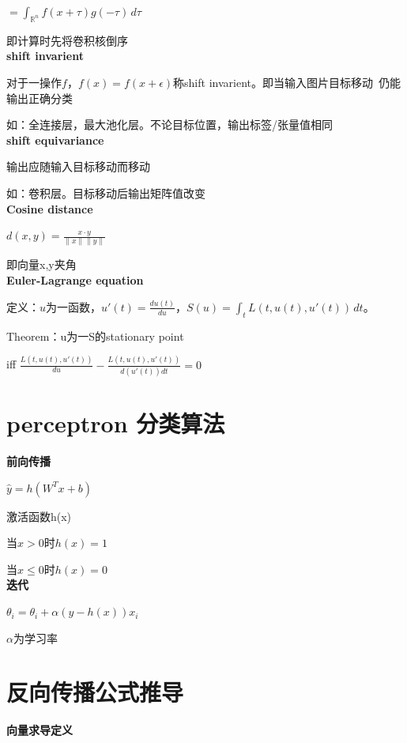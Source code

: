 \documentclass[UTF8]{ctexart}
\begin{document}
  \quad \quad $ = \int_{\mathbb{R}^n} f(x + \tau)g(-\tau) \,d\tau$
  
  \quad \quad 即计算时先将卷积核倒序\\
\textbf{shift invarient}

  对于一操作$f$，$f(x) = f(x + \epsilon)$称shift invarient。即当输入图片目标移动\ 仍能输出正确分类
  
  如：全连接层，最大池化层。不论目标位置，输出标签/张量值相同\\
\textbf{shift equivariance}

  输出应随输入目标移动而移动

  如：卷积层。目标移动后输出矩阵值改变\\
\textbf{Cosine distance}

  $d(x, y) = \frac{x \cdot y}{\|x\|\|y\|}$

  即向量x,y夹角\\
\textbf{Euler-Lagrange equation}

  定义：$u$为一函数，$u'(t) = \frac{du(t)}{du}$，$S(u)= \int_{t} L(t, u(t), u'(t)) \,dt$。

  Theorem：u为一S的stationary point
  
  \quad iff $\frac{L(t, u(t), u'(t))}{du} - \frac{L(t, u(t), u'(t))}{d(u'(t))dt} = 0$

\section{perceptron 分类算法}
\noindent \textbf{前向传播}

  $\hat{y} = h(W^Tx + b)$
  
  激活函数h(x)

  \quad 当$x > 0$时$h(x) = 1$

  \quad 当$x \leq 0$时$h(x) = 0$\\
\textbf{迭代}

  $\theta_i = \theta_i + \alpha(y - h(x))x_i$
  
  \quad $\alpha$为学习率

\section{反向传播公式推导}
\noindent \textbf{向量求导定义}
\end{document}
